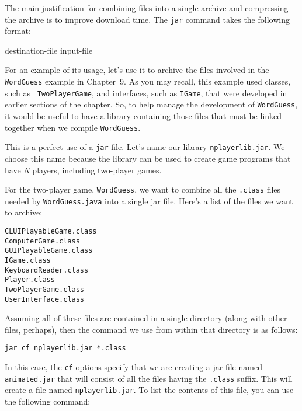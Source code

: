 The main justification for combining files into a single archive and
compressing the archive is to improve download time.  The {\tt jar}
command takes the following format:

\vspace{6pt plus4pt minus2pt}
 \qquad [ {\it options} ] destination-file \qquad 
 input-file 

\vspace{6pt plus4pt minus2pt}\noindent For an example of its usage, let's use it to
archive the files involved in the {\tt WordGuess} example in
Chapter~9. As you may recall, this example used classes, such as {\tt
TwoPlayerGame}, and interfaces, such as {\tt IGame}, that were
developed in earlier sections of the chapter.  So, to help manage the
development of {\tt WordGuess}, it would be useful to have a library
containing those files that must be linked together when we compile
{\tt WordGuess}. 

This is a perfect use of a {\tt jar} file. Let's name our library
{\tt nplayerlib.jar}. We choose this name because the library
can be used to create game programs that have {\em N} players,
including two-player games.

For the two-player game, {\tt WordGuess}, we want to combine all the
{\tt .class} files needed by {\tt WordGuess.java} into a single jar
file.  Here's a list of the files we want to archive:

\begin{jjjlisting}
\begin{lstlisting}
CLUIPlayableGame.class
ComputerGame.class
GUIPlayableGame.class
IGame.class
KeyboardReader.class
Player.class
TwoPlayerGame.class
UserInterface.class
\end{lstlisting}
\end{jjjlisting}

\noindent Assuming all of these files are contained in a single
directory (along with other files, perhaps), then the command we use
from within that directory is as follows:

\begin{jjjlisting}
\begin{lstlisting}
jar cf nplayerlib.jar *.class
\end{lstlisting}
\end{jjjlisting}

\noindent In this case, the {\tt cf} options specify that we are
creating a jar file named {\tt animated.jar} that will consist of all
the files having the {\tt .class} suffix.  This will create a
file named {\tt nplayerlib.jar}.  To list the contents of this
file, you can use the following command:

